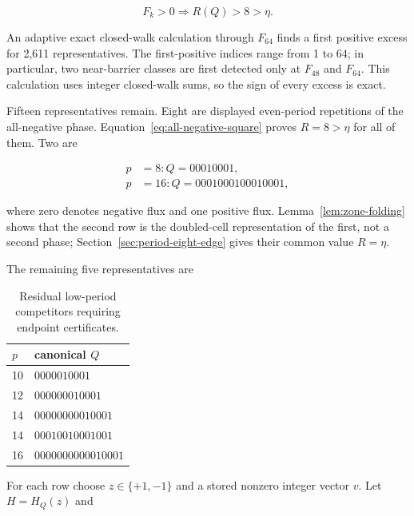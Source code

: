 \begin{equation}
\label{eq:frontier-moment-exclusion}
F_k>0 \Longrightarrow R(Q)>8>\eta.
\end{equation}

An adaptive exact closed-walk calculation through \(F_{64}\) finds a first
positive excess for 2,611 representatives. The first-positive indices range
from 1 to 64; in particular, two near-barrier classes are first detected only
at \(F_{48}\) and \(F_{64}\). This calculation uses integer closed-walk sums, so the
sign of every excess is exact.

Fifteen representatives remain. Eight are displayed even-period repetitions
of the all-negative phase. Equation~\eqref{eq:all-negative-square} proves \(R=8>\eta\) for all of them.
Two are

\begin{equation}
\label{eq:target-zone-folding-rows}
\begin{aligned}
p&=8:  Q=00010001, \\
p&=16: Q=0001000100010001,
\end{aligned}
\end{equation}

where zero denotes negative flux and one positive flux. Lemma~\ref{lem:zone-folding} shows that
the second row is the doubled-cell representation of the first, not a second
phase; Section~\ref{sec:period-eight-edge} gives their common value \(R=\eta\).

The remaining five representatives are

\begin{table}[tbp]
\centering
\caption{Residual low-period competitors requiring endpoint certificates.}
\label{tab:residual-competitors}
\begingroup
\renewcommand{\arraystretch}{1.12}
\begin{tabular}{ll}
\toprule
\(p\) & canonical \(Q\) \\
\midrule
10 & \(0000010001\) \\
12 & \(000000010001\) \\
14 & \(00000000010001\) \\
14 & \(00010010001001\) \\
16 & \(0000000000010001\) \\
\bottomrule
\end{tabular}
\endgroup
\end{table}

For each row choose \(z \in \{+1,-1\}\) and a stored nonzero integer vector \(v\).
Let \(H=H_Q(z)\) and

